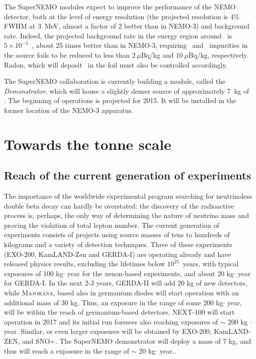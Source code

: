 \documentclass{PoS}
\begin{document}
The SuperNEMO modules expect to improve the performance of the NEMO detector, both at the level of energy resolution (the projected resolution is 4\% FWHM at 3~MeV, almost a factor of 2 better than in NEMO-3) and background rate. Indeed, the 
projected background rate in the energy region around \Qbb\ is $5\times10^{-5}$~\ckky, about 25 times better than in NEMO-3, requiring \BI\ and \TL\ impurities in the source foils to be reduced to less than $2~\mu$Bq/kg and $10~\mu$Bq/kg, respectively. Radon, which will deposit \BI\ in the foil must also be controlled accordingly. 

The SuperNEMO collaboration is currently building a module, 
called the \emph{Demonstrator}, which will house a slightly denser source of approximately 7~kg of \SE. The beginning of operations is projected for 2015. It will be installed in the former location of the NEMO-3 apparatus. 


\section{Towards the tonne scale} \label{tonne}


\subsection{Reach of the current generation of experiments}
The importance of the worldwide experimental program searching for neutrinoless double beta decay can hardly be overstated: the discovery of the radioactive process is, perhaps, the only way of determining the nature of neutrino mass and proving the violation of total lepton number. The current generation of experiments consists of projects using source masses of tens to hundreds of kilograms and a variety of detection techniques.  Three of these experiments (EXO-200, KamLAND-Zen and GERDA-I) are operating already and have released physics results, excluding the lifetimes below $10^{25}$~years, with typical exposures of 100 kg$\cdot$ year for the xenon-based experiments, and about  20 kg$\cdot$ year for GERDA-I. In the next 2-3 years, GERDA-II will add 20 kg of new detectors, while {\scshape Majorana}, based also in germanium diodes will start operation with an additional mass of 30 kg. Thus, an exposure in the range of some 200 kg$\cdot$ year, will be within the reach of germanium-based detectors.  NEXT-100  will start operation in 2017 and its initial run foresees also reaching exposures 
of $\sim$ 200 kg $\cdot$ year. Similar, or even larger exposures will be obtained by EXO-200, KamLAND-ZEN, and SNO+. The SuperNEMO demonstrator will deploy a mass of 7 kg, and thus will reach a exposure in the range of $\sim$  20 kg$\cdot$ year.. 
\end{document}
